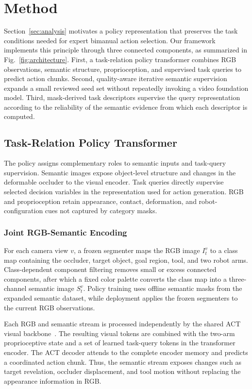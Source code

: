 \section{Method}
\label{sec:method}
Section~\ref{sec:analysis} motivates a policy representation that preserves the task conditions needed for expert bimanual action selection.
Our framework implements this principle through three connected components, as summarized in Fig.~\ref{fig:architecture}.
First, a task-relation policy transformer combines RGB observations, semantic structure, proprioception, and supervised task queries to predict action chunks.
Second, quality-aware iterative semantic supervision expands a small reviewed seed set without repeatedly invoking a video foundation model.
Third, mask-derived task descriptors supervise the query representation according to the reliability of the semantic evidence from which each descriptor is computed.

\subsection{Task-Relation Policy Transformer}
\label{sec:methodpolicy}
The policy assigns complementary roles to semantic inputs and task-query supervision.
Semantic images expose object-level structure and changes in the deformable occluder to the visual encoder.
Task queries directly supervise selected decision variables in the representation used for action generation.
RGB and proprioception retain appearance, contact, deformation, and robot-configuration cues not captured by category masks.

\subsubsection{Joint RGB-Semantic Encoding}
For each camera view $v$, a frozen segmenter maps the RGB image $I_t^v$ to a class map containing the occluder, target object, goal region, tool, and two robot arms.
Class-dependent component filtering removes small or excess connected components, after which a fixed color palette converts the class map into a three-channel semantic image $S_t^v$.
Policy training uses offline semantic masks from the expanded semantic dataset, while deployment applies the frozen segmenters to the current RGB observations.

Each RGB and semantic stream is processed independently by the shared ACT visual backbone~\cite{zhao2023act}.
The resulting visual tokens are combined with the two-arm proprioceptive state and a set of learned task-query tokens in the transformer encoder.
The ACT decoder attends to the complete encoder memory and predicts a coordinated action chunk.
Thus, the semantic stream exposes changes such as target revelation, occluder displacement, and tool motion without replacing the appearance information in RGB.

